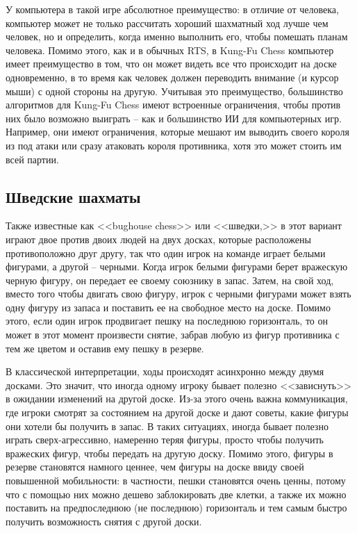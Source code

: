 \documentclass{article}
\begin{document}
У компьютера в такой игре абсолютное преимущество:
в отличие от человека, компьютер может не только рассчитать хороший шахматный ход лучше чем человек,
но и определить, когда именно выполнить его, чтобы помешать планам человека.
Помимо этого, как и в обычных RTS, в Kung-Fu Chess
компьютер имеет преимущество в том, что он может видеть все что происходит на доске одновременно,
в то время как человек должен переводить внимание (и курсор мыши) с одной стороны на другую.
Учитывая это преимущество,
большинство алгоритмов для Kung-Fu Chess 
имеют встроенные ограничения,
чтобы против них было возможно выиграть -- 
как и большинство ИИ для компьютерных игр.
Например, они имеют ограничения,
которые мешают им выводить своего короля из под атаки
или сразу атаковать короля противника,
хотя это может стоить им всей партии.

\subsection{Шведские шахматы}

Также известные как <<bughouse chess>> или <<шведки,>>
в этот вариант играют двое против двоих людей на двух досках,
которые расположены противоположно друг другу,
так что один игрок на команде играет белыми фигурами, а другой -- черными.
Когда игрок белыми фигурами берет вражескую черную фигуру, он передает ее
своему союзнику в запас.
Затем, на свой ход, вместо того чтобы двигать свою фигуру,
игрок с черными фигурами может взять одну фигуру из запаса и поставить ее на свободное место на доске.
Помимо этого, если один игрок продвигает пешку на последнюю горизонталь,
то он может в этот момент произвести снятие, забрав любую из фигур противника с тем же цветом и оставив ему пешку в резерве.

В классической интерпретации, ходы происходят асинхронно между двумя досками.
Это значит, что иногда одному игроку бывает полезно <<зависнуть>>
в ожидании изменений на другой доске.
Из-за этого очень важна коммуникация, где игроки смотрят за состоянием на другой доске
и дают советы, какие фигуры они хотели бы получить в запас. 
В таких ситуациях, иногда бывает полезно играть сверх-агрессивно,
намеренно теряя фигуры,
просто чтобы получить вражеских фигур, чтобы передать на другую доску.
Помимо этого, фигуры в резерве становятся намного ценнее, чем фигуры на доске ввиду своей повышенной мобильности:
в частности, пешки становятся очень ценны,
потому что с помощью них можно дешево заблокировать две клетки,
а также их можно поставить на предпоследнюю (не последнюю) горизонталь и тем самым быстро получить возможность снятия с другой доски.
\end{document}
